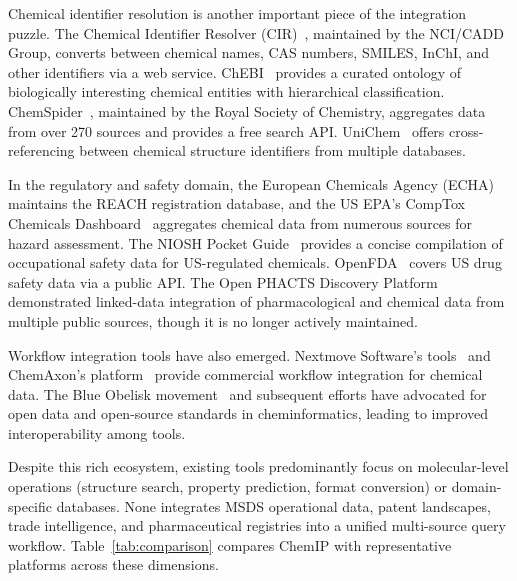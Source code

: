 \documentclass[10pt]{article}
\begin{document}
Chemical identifier resolution is another important piece of the integration puzzle.
The Chemical Identifier Resolver (CIR)~\cite{cir_nci}, maintained by the NCI/CADD Group, converts between chemical names, CAS numbers, SMILES, InChI, and other identifiers via a web service.
ChEBI~\cite{chebi} provides a curated ontology of biologically interesting chemical entities with hierarchical classification.
ChemSpider~\cite{chemspider}, maintained by the Royal Society of Chemistry, aggregates data from over 270 sources and provides a free search API.
UniChem~\cite{unichem} offers cross-referencing between chemical structure identifiers from multiple databases.

In the regulatory and safety domain, the European Chemicals Agency (ECHA)~\cite{echa} maintains the REACH registration database, and the US EPA's CompTox Chemicals Dashboard~\cite{comptox} aggregates chemical data from numerous sources for hazard assessment.
The NIOSH Pocket Guide~\cite{niosh} provides a concise compilation of occupational safety data for US-regulated chemicals.
OpenFDA~\cite{openfda} covers US drug safety data via a public API.
The Open PHACTS Discovery Platform~\cite{openphacts} demonstrated linked-data integration of pharmacological and chemical data from multiple public sources, though it is no longer actively maintained.

Workflow integration tools have also emerged.
Nextmove Software's tools~\cite{nextmove} and ChemAxon's platform~\cite{chemaxon} provide commercial workflow integration for chemical data.
The Blue Obelisk movement~\cite{blueobelisk} and subsequent efforts have advocated for open data and open-source standards in cheminformatics, leading to improved interoperability among tools.

Despite this rich ecosystem, existing tools predominantly focus on molecular-level operations (structure search, property prediction, format conversion) or domain-specific databases.
None integrates MSDS operational data, patent landscapes, trade intelligence, and pharmaceutical registries into a unified multi-source query workflow.
Table~\ref{tab:comparison} compares ChemIP with representative platforms across these dimensions.
\end{document}
